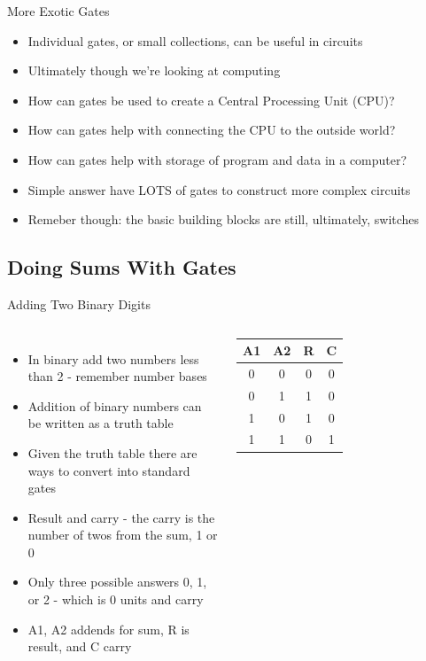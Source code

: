 \documentclass{beamer}
\begin{document}
\begin{frame}{More Exotic Gates}
  \begin{itemize}
  \item
    Individual gates, or small collections, can be useful in circuits
  \item
    Ultimately though we're looking at computing
  \item
    How can gates be used to create a Central Processing Unit (CPU)?
  \item
    How can gates help with connecting the CPU to the outside world?
  \item
    How can gates help with storage of program and data in a computer?
  \item
    Simple answer have LOTS of gates to construct more complex circuits
  \item
    Remeber though: the basic building blocks are still, ultimately, switches
  \end{itemize}
\end{frame}


\subsection[LogicComponents]{Doing Sums With Gates}

\begin{frame}{Adding Two Binary Digits}
  \begin{columns}
    \begin{itemize}
    \item
      In binary add two numbers less than 2 - remember number bases
    \item
      Addition of binary numbers can be written as a truth table
    \item
      Given the truth table there are ways to convert into standard gates
    \item
      Result and carry - the carry is the number of twos from the sum, 1 or 0
    \item
      Only three possible answers 0, 1, or 2 - which is 0 units and carry 
    \item
      A1, A2 addends for sum, R is result, and C carry
    \end{itemize}
    

    \begin{tabular}{cccc}
      \hline
      \textbf{A1} & \textbf{A2} & \textbf{R} & \textbf{C}\\
      \hline
      0 & 0 & 0 & 0 \\
      0 & 1 & 1 & 0 \\
      1 & 0 & 1 & 0 \\
      1 & 1 & 0 & 1 \\
      \hline
    \end{tabular}
  \end{columns}  
\end{frame}
\end{document}
